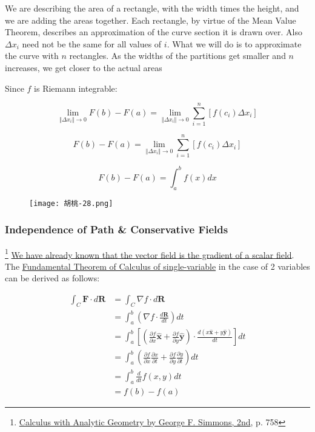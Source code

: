 We are describing the area of a rectangle, with the width times the height, and we are adding the areas together. Each
rectangle, by virtue of the Mean Value Theorem, describes an approximation of the curve section it is drawn over. Also
$\Delta x_i$ need not be the same for all values of $i$. What we will do is to approximate the curve with $n$
rectangles. As the widths of the partitions get smaller and $n$ increases, we get closer to the actual areas

Since $f$ is Riemann integrable:

\begin{equation}
    \lim\limits_{\Vert \Delta x_i \Vert \rightarrow 0}F(b) - F(a) = \lim\limits_{\Vert \Delta x_i \Vert \rightarrow 0}\sum_{i = 1}^n \left[ f(c_i)\Delta x_i \right]
\end{equation}

\begin{equation}
    F(b) - F(a) = \lim\limits_{\Vert \Delta x_i \Vert \rightarrow 0}\sum_{i = 1}^n \left[ f(c_i)\Delta x_i \right]
\end{equation}

\begin{equation}
    F(b) - F(a) = \int_a^b f(x) dx
\end{equation}

\begin{figure}[H]
    \begin{flushright}
        \texttt{[image: 胡桃-28.png]}
    \end{flushright}
\end{figure}

\subsubsection{Independence of Path \& Conservative Fields}

\footnote{\href{https://trello.com/c/byu9Pyy8}{Calculus with Analytic Geometry by George F. Simmons, 2nd}, p. 758} \hyperlink{vector-field}{We have already known that the vector field is the gradient of a scalar field}. The
\hyperlink{fundamental-theorem-of-calculus-part-2}{Fundamental Theorem of Calculus of single-variable} in the case of
2 variables can be derived as follows:

\begin{align}
    \int_C\boldsymbol{F}\cdot d\boldsymbol{R} &= \int_C \nabla f \cdot d\boldsymbol{R} \\
    &= \int_a^b\left( \nabla f \cdot \frac{d\boldsymbol{R}}{dt} \right)dt \\
    &= \int_a^b\left[ \left( \frac{\partial f}{\partial x}\boldsymbol{\hat{x}} + \frac{\partial f}{\partial y}\boldsymbol{\hat{y}} \right)  \cdot \frac{d(x\boldsymbol{\hat{x}} + y\boldsymbol{\hat{y}})}{dt} \right]dt \\
    &= \int_a^b\left( \frac{\partial f}{\partial x}\frac{\partial x}{\partial t} + \frac{\partial f}{\partial y}\frac{\partial y}{\partial t} \right)dt \\
    &= \int_a^b \frac{d}{dt}f(x, y)dt \\
    &= f(b) - f(a)
\end{align}

